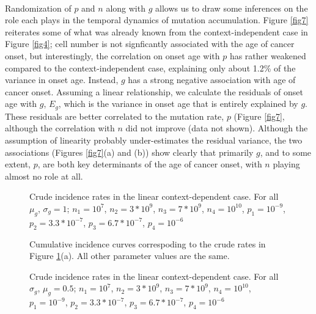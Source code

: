 \documentclass[12pt, onecolumn]{article}
\begin{document}
	\paragraph{\empty}Randomization of $p$ and $n$ along with $g$ allows us to draw some inferences on the role each plays in the temporal dynamics of mutation accumulation. Figure \ref{fig7} reiterates some of what was already known from the context-independent case in Figure \ref{fig4}; cell number is not signficantly associated with the age of cancer onset, but interestingly, the correlation on onset age with $p$ has rather weakened compared to the context-independent case, explaining only about 1.2\% of the variance in onset age. Instead, $g$ has a strong negative association with age of cancer onset. Assuming a linear relationship, we calculate the residuals of onset age with $g$, $E_{g}$, which is the variance in onset age that is entirely explained by $g$. These residuals are better correlated to the mutation rate, $p$ (Figure \ref{fig7}, although the correlation with $n$ did not improve (data not shown). Although the assumption of linearity probably under-estimates the residual variance, the two associations (Figures \ref{fig7}(a) and (b)) show clearly that primarily $g$, and to some extent, $p$, are both key determinants of the age of cancer onset, with $n$ playing almost no role at all.
	
	\begin{figure}[p]
		\ContinuedFloat*
		\centering
		\def\svgwidth{0.75\textwidth}
		
		\caption{\label{fig5a} Crude incidence rates in the linear context-dependent case. For all $\mu_{g}$, $\sigma_{g}=1$; 
			$n_{1} = 10^{7}$, $n_{2} = 3*10^{9}$, $n_{3} = 7*10^{9}$, $n_{4} = 10^{10}$, $p_{1}= 10^{-9}$, $p_{2} = 3.3*10^{-7}$, $p_{3} = 6.7*10^{-7}$, $p_{4} = 10^{-6}$}
	\end{figure}
	\begin{figure}
		\ContinuedFloat
		\centering
		\def\svgwidth{0.75\textwidth}
		
		\caption{\label{fig5b} Cumulative incidence curves correspoding to the crude rates in Figure \ref{fig5a}(a). All other parameter values are the same.}
	\end{figure}
	
	\begin{figure}
		\ContinuedFloat*
		\centering
		\def\svgwidth{0.7\textwidth}
		
		\caption{\label{fig6a} Crude incidence rates in the linear context-dependent case. For all $\sigma_{g}$, $\mu_{g}=0.5$; 
			$n_{1} = 10^{7}$, $n_{2} = 3*10^{9}$, $n_{3} = 7*10^{9}$, $n_{4} = 10^{10}$, $p_{1}= 10^{-9}$, $p_{2} = 3.3*10^{-7}$, $p_{3} = 6.7*10^{-7}$, $p_{4} = 10^{-6}$}
	\end{figure}
\end{document}
